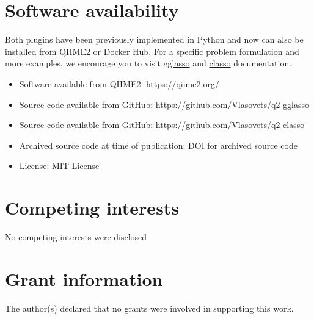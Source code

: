 \documentclass[10pt,a4paper]{article}
\begin{document}
\section*{Software availability}

Both plugins have been previously implemented in Python and now can also be installed from QIIME2 or \href{https://hub.docker.com}{Docker Hub}. For a specific problem formulation and more examples, we encourage you to visit \href{https://gglasso--37.org.readthedocs.build/en/37/getting-started.html}{gglasso} and \href{https://c-lasso.readthedocs.io/en/latest/index.html}{classo} documentation.

\begin{itemize}
	\item Software available from QIIME2: https://qiime2.org/
	\item Source code available from GitHub: https://github.com/Vlasovets/q2-gglasso
    \item Source code available from GitHub: https://github.com/Vlasovets/q2-classo
	\item Archived source code at time of publication: DOI for archived source code
	\item License: MIT License
\end{itemize}

\section*{Competing interests}
No competing interests were disclosed

\section*{Grant information}
The author(s) declared that no grants were involved in supporting this work.
\end{document}
